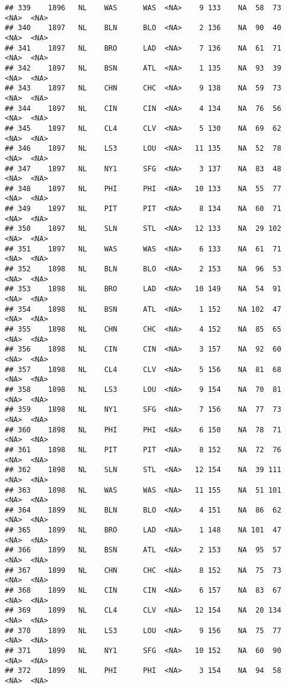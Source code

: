 \documentclass[]{article}
\begin{document}
\begin{verbatim}
## 339    1896   NL    WAS      WAS  <NA>    9 133    NA  58  73   <NA>  <NA>
## 340    1897   NL    BLN      BLO  <NA>    2 136    NA  90  40   <NA>  <NA>
## 341    1897   NL    BRO      LAD  <NA>    7 136    NA  61  71   <NA>  <NA>
## 342    1897   NL    BSN      ATL  <NA>    1 135    NA  93  39   <NA>  <NA>
## 343    1897   NL    CHN      CHC  <NA>    9 138    NA  59  73   <NA>  <NA>
## 344    1897   NL    CIN      CIN  <NA>    4 134    NA  76  56   <NA>  <NA>
## 345    1897   NL    CL4      CLV  <NA>    5 130    NA  69  62   <NA>  <NA>
## 346    1897   NL    LS3      LOU  <NA>   11 135    NA  52  78   <NA>  <NA>
## 347    1897   NL    NY1      SFG  <NA>    3 137    NA  83  48   <NA>  <NA>
## 348    1897   NL    PHI      PHI  <NA>   10 133    NA  55  77   <NA>  <NA>
## 349    1897   NL    PIT      PIT  <NA>    8 134    NA  60  71   <NA>  <NA>
## 350    1897   NL    SLN      STL  <NA>   12 133    NA  29 102   <NA>  <NA>
## 351    1897   NL    WAS      WAS  <NA>    6 133    NA  61  71   <NA>  <NA>
## 352    1898   NL    BLN      BLO  <NA>    2 153    NA  96  53   <NA>  <NA>
## 353    1898   NL    BRO      LAD  <NA>   10 149    NA  54  91   <NA>  <NA>
## 354    1898   NL    BSN      ATL  <NA>    1 152    NA 102  47   <NA>  <NA>
## 355    1898   NL    CHN      CHC  <NA>    4 152    NA  85  65   <NA>  <NA>
## 356    1898   NL    CIN      CIN  <NA>    3 157    NA  92  60   <NA>  <NA>
## 357    1898   NL    CL4      CLV  <NA>    5 156    NA  81  68   <NA>  <NA>
## 358    1898   NL    LS3      LOU  <NA>    9 154    NA  70  81   <NA>  <NA>
## 359    1898   NL    NY1      SFG  <NA>    7 156    NA  77  73   <NA>  <NA>
## 360    1898   NL    PHI      PHI  <NA>    6 150    NA  78  71   <NA>  <NA>
## 361    1898   NL    PIT      PIT  <NA>    8 152    NA  72  76   <NA>  <NA>
## 362    1898   NL    SLN      STL  <NA>   12 154    NA  39 111   <NA>  <NA>
## 363    1898   NL    WAS      WAS  <NA>   11 155    NA  51 101   <NA>  <NA>
## 364    1899   NL    BLN      BLO  <NA>    4 151    NA  86  62   <NA>  <NA>
## 365    1899   NL    BRO      LAD  <NA>    1 148    NA 101  47   <NA>  <NA>
## 366    1899   NL    BSN      ATL  <NA>    2 153    NA  95  57   <NA>  <NA>
## 367    1899   NL    CHN      CHC  <NA>    8 152    NA  75  73   <NA>  <NA>
## 368    1899   NL    CIN      CIN  <NA>    6 157    NA  83  67   <NA>  <NA>
## 369    1899   NL    CL4      CLV  <NA>   12 154    NA  20 134   <NA>  <NA>
## 370    1899   NL    LS3      LOU  <NA>    9 156    NA  75  77   <NA>  <NA>
## 371    1899   NL    NY1      SFG  <NA>   10 152    NA  60  90   <NA>  <NA>
## 372    1899   NL    PHI      PHI  <NA>    3 154    NA  94  58   <NA>  <NA>

\end{verbatim}
\end{document}
